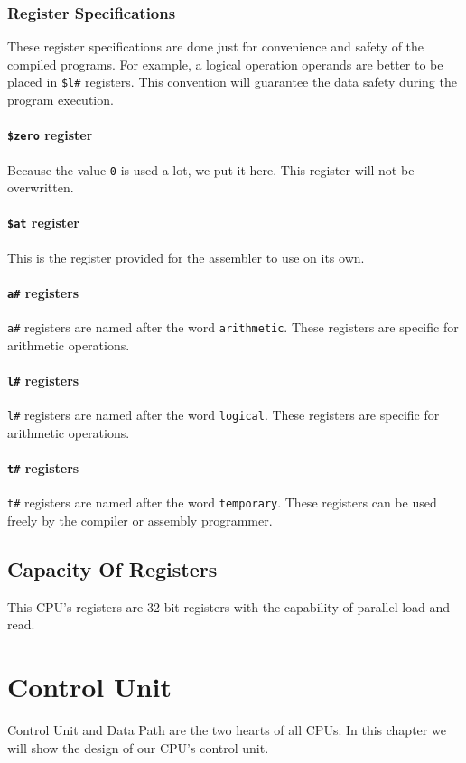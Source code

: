 \documentclass[12pt, dvipsnames, svgnames, x11names, oneside]{book}
\newenvironment{sansserif}{\sffamily}{\normalfont}
\begin{document}
		\subsection{Register Specifications}
		These register specifications are done just for convenience and safety of the compiled programs. For example, a logical operation operands are better to be placed in \texttt{\$l\#} registers. This convention will guarantee the data safety during the program execution.
		
		\subsubsection{\texttt{\$zero} register}
		Because the value \texttt{0} is used a lot, we put it here. This register will not be overwritten.
		\subsubsection{\texttt{\$at} register}
		This is the register provided for the assembler to use on its own.
		\subsubsection{\texttt{a\#} registers}
		\texttt{a\#} registers are named after the word \texttt{arithmetic}. These registers are specific for arithmetic operations.
		\subsubsection{\texttt{l\#} registers}
		\texttt{l\#} registers are named after the word \texttt{logical}. These registers are specific for arithmetic operations.
		
		\subsubsection{\texttt{t\#} registers}			
		\texttt{t\#} registers are named after the word \texttt{temporary}. These registers can be used freely by the compiler or assembly programmer.
		
		\section{Capacity Of Registers}\label{sec:cap-of-regs}
		This CPU's registers are 32-bit registers with the capability of parallel load and read.
				
		\chapter{Control Unit}
		\begin{sansserif}
			Control Unit and Data Path are the two hearts of all CPUs. In this chapter we will show the design of our CPU's control unit.
		\end{sansserif}
		
\end{document}
